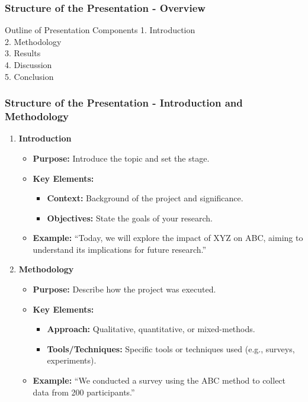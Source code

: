 \documentclass{beamer}
\begin{document}
\begin{frame}[fragile]
    \frametitle{Structure of the Presentation - Overview}
    
    \begin{block}{Outline of Presentation Components}
        1. Introduction \\
        2. Methodology \\
        3. Results \\
        4. Discussion \\
        5. Conclusion
    \end{block}
\end{frame}

\begin{frame}[fragile]
    \frametitle{Structure of the Presentation - Introduction and Methodology}

    \begin{enumerate}
        \item \textbf{Introduction}
            \begin{itemize}
                \item \textbf{Purpose:} Introduce the topic and set the stage.
                \item \textbf{Key Elements:}
                    \begin{itemize}
                        \item \textbf{Context:} Background of the project and significance.
                        \item \textbf{Objectives:} State the goals of your research.
                    \end{itemize}
                \item \textbf{Example:} 
                    “Today, we will explore the impact of XYZ on ABC, aiming to understand its implications for future research.”
            \end{itemize}
            
        \item \textbf{Methodology}
            \begin{itemize}
                \item \textbf{Purpose:} Describe how the project was executed.
                \item \textbf{Key Elements:}
                    \begin{itemize}
                        \item \textbf{Approach:} Qualitative, quantitative, or mixed-methods.
                        \item \textbf{Tools/Techniques:} Specific tools or techniques used (e.g., surveys, experiments).
                    \end{itemize}
                \item \textbf{Example:} 
                    “We conducted a survey using the ABC method to collect data from 200 participants.”
            \end{itemize}
    \end{enumerate}
\end{frame}
\end{document}
